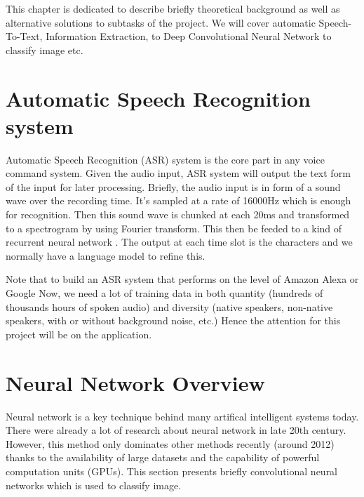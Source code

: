 This chapter is dedicated to describe briefly theoretical background as well as alternative solutions to subtasks of the project. We will cover automatic Speech-To-Text, Information Extraction, to Deep Convolutional Neural Network to classify image etc.
\section{Automatic Speech Recognition system}
Automatic Speech Recognition (ASR) system is the core part in any voice command system. Given the audio input, ASR system will output the text form of the input for later processing. Briefly, the audio input is in form of a sound wave over the recording time. It's sampled at a rate of 16000Hz which is enough for recognition. Then this sound wave is chunked at each 20ms and transformed to a spectrogram by using Fourier transform. This then be feeded to a kind of recurrent neural network \cite{Medium:2016}. The output at each time slot is the characters and we normally have a language model to refine this. 

Note that to build an ASR system that performs on the level of Amazon Alexa or Google Now, we need a lot of training data in both quantity (hundreds of thousands hours of spoken audio) and diversity (native speakers, non-native speakers, with or without background noise, etc.) Hence the attention for this project will be on the application.

\section{Neural Network Overview}
Neural network is a key technique behind many artifical intelligent systems today. There were already a lot of research about neural network in late 20th century. However, this method only dominates other methods recently (around 2012) thanks to the availability of large datasets and the capability of powerful computation units (GPUs). This section presents briefly convolutional neural networks which is used to classify image.
